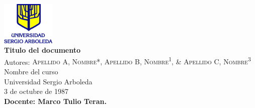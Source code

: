 \documentclass[
10pt,			%
letterpaper,	%
oneside,		%
headinclude, footinclude, %
BCOR5mm, 		%
]{scrartcl}
\newcommand{\FirstAuthor}{Apellido A, Nombre}    %
\newcommand{\SecondAuthor}{Apellido B, Nombre}
\newcommand{\ThirdAuthor}{Apellido C, Nombre}
\newcommand{\WorkName}{Titulo del documento}  %
\newcommand{\CourseName}{Nombre del curso}
\newcommand{\UniversityName}{Universidad Sergio Arboleda}
\newcommand{\WorkDate}{3 de octubre de 1987}
\begin{document}
	



\renewcommand{\sectionmark}[1]{\markright{\spacedlowsmallcaps{#1}}} %
\lehead{\mbox{\llap{\small\thepage\kern1em\color{halfgray} \vline}\color{halfgray}\hspace{0.5em}\rightmark\hfil}} %

\pagestyle{scrheadings} %


\begin{minipage}{0.9\textwidth}
	\begin{center}
		\vspace{3ex}
		\includegraphics[width=1.0in]{./structure/USAlogo} \\
		\vspace{1.5ex}
		{\huge \textbf{\WorkName}} \\ \vspace{1ex}
		{Autores: \textsc{\FirstAuthor*, \SecondAuthor\textsuperscript{1}, \& \ThirdAuthor\textsuperscript{3}}\\}
		{\CourseName\\
			\UniversityName\\
			\WorkDate}\\
		{\textbf{Docente: Marco Tulio Teran.}} \vspace{1ex}	
	\end{center}
	\vspace{1ex}
\end{minipage}

\end{document}
